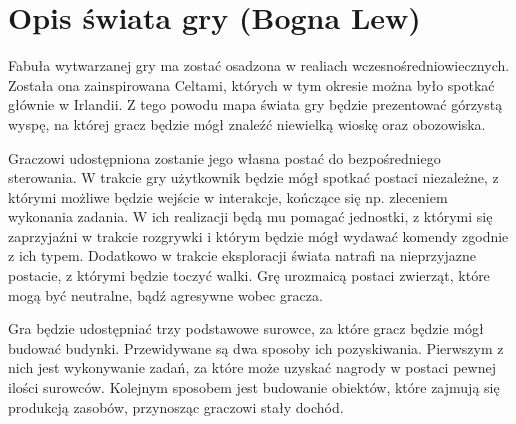 \section{Opis świata gry (Bogna Lew)}
Fabuła wytwarzanej gry ma zostać osadzona w realiach wczesnośredniowiecznych. Została ona zainspirowana Celtami, których
w tym okresie można było spotkać głównie w Irlandii. Z tego powodu mapa świata gry będzie prezentować górzystą wyspę, na
której gracz będzie mógł znaleźć niewielką wioskę oraz obozowiska.

Graczowi udostępniona zostanie jego własna postać do bezpośredniego sterowania. W trakcie gry użytkownik będzie
mógł spotkać postaci niezależne, z którymi możliwe będzie wejście w interakcje, kończące się np. zleceniem wykonania zadania.
W ich realizacji będą mu pomagać jednostki, z którymi się zaprzyjaźni w trakcie rozgrywki i którym będzie mógł wydawać
komendy zgodnie z ich typem. Dodatkowo w trakcie eksploracji świata natrafi na nieprzyjazne postacie, z którymi
będzie toczyć walki. Grę urozmaicą postaci zwierząt, które mogą być neutralne, bądź agresywne wobec gracza.

Gra będzie udostępniać trzy podstawowe surowce, za które gracz będzie mógł budować budynki. Przewidywane są dwa sposoby
ich pozyskiwania. Pierwszym z nich jest wykonywanie zadań, za które może uzyskać nagrody w postaci pewnej ilości
surowców. Kolejnym sposobem jest budowanie obiektów, które zajmują się produkcją zasobów, przynosząc graczowi stały
dochód.
